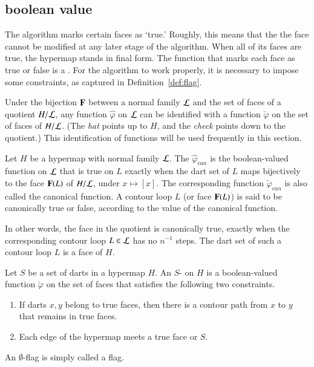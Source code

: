\subsection{boolean value}
%

The algorithm  marks certain faces as `true.'
Roughly, this  means that the the face cannot be modified
at any later stage of the algorithm.   When all of its faces
are true, the hypermap stands in final form.
The function that marks each face as true or false is a
.  For the algorithm to work properly, it is necessary
to impose some constraints, as captured in Definition~\ref{def:flag}.
%


Under the bijection ${\mathbf F}$ between a normal family ${\cal L}$ and the set of
faces of a quotient $H/{\cal L}$, any function $\hat\varphi$ on ${\cal L}$
can be identified with a function $\check\varphi$ on the set of faces of $H/{\cal L}$.
(The {\it hat} points up to $H$, and the {\it check} points down to the quotient.)
This identification of functions will be used frequently in this section.

\begin{definition}
 Let $H$ be a hypermap with
  normal family $\cal L$.  The 
  $\hat\varphi_{can}$ is the boolean-valued function on ${\cal L}$
  that is true on $L$ exactly when the dart set of $L$ maps
  bijectively to the face ${\mathbf F}(L)$ of $H/{\cal L}$, under $x\mapsto [x]$.  The
  corresponding function $\check\varphi_{can}$ is also called the
  canonical function.  A contour loop $L$ (or face ${\mathbf F}(L)$)
  is said to be canonically true or false, according to the value of the canonical
  function.  
%
\end{definition}

In other words, the face in the quotient is canonically true, exactly
when the corresponding contour loop $L\in {\cal L}$ has no $n^{-1}$
steps.  The dart set of such a contour loop $L$ is a face of $H$.  


\begin{definition}[flag]\label{def:flag} 
  Let $S$ be a set of darts in a hypermap $H$.  An $S$-
  on $H$ is a boolean-valued function $\check\varphi$ on the set of faces that
  satisfies the following two constraints.
\begin{enumerate}
\item If darts $x,y$ belong to true faces,
then there is a contour path from $x$ to $y$ that remains
in true faces.
\item Each edge of the hypermap meets a true face or $S$.
\end{enumerate}
An $\emptyset$-flag is simply called a flag.
%
%
\end{definition}



